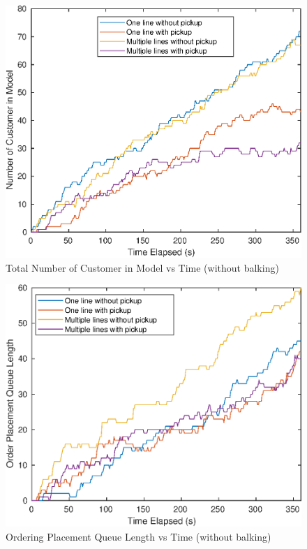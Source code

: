 \documentclass[a4paper]{article}
\begin{document}
\begin{figure}[H]
	\centering
	\includegraphics[width=0.40\textheight]{population_vs_time_ext}
	\caption{Total Number of Customer in Model vs Time (without balking)}
\end{figure}

\begin{figure}[H]
	\centering
	\includegraphics[width=0.40\textheight]{queue_length_vs_time_ext}
	\caption{Ordering Placement Queue Length vs Time (without balking)}
\end{figure}
\end{document}
